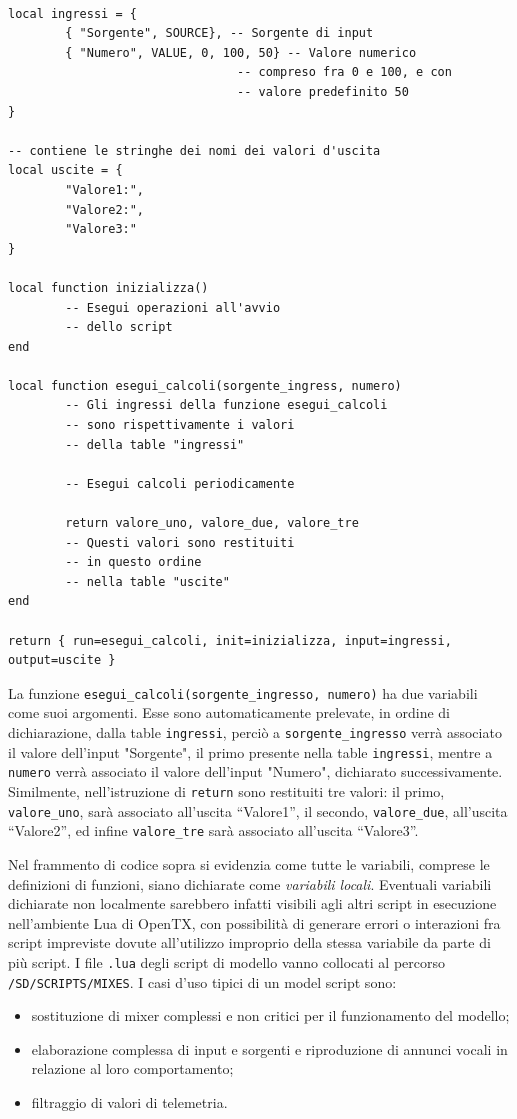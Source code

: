 \documentclass[a4paper, 12pt]{report}
\begin{document}
\begin{lstlisting}

local ingressi = {
        { "Sorgente", SOURCE}, -- Sorgente di input
        { "Numero", VALUE, 0, 100, 50} -- Valore numerico
                                -- compreso fra 0 e 100, e con 
                                -- valore predefinito 50
}

-- contiene le stringhe dei nomi dei valori d'uscita
local uscite = { 
        "Valore1:",
        "Valore2:",
        "Valore3:"
}

local function inizializza()
        -- Esegui operazioni all'avvio
        -- dello script
end

local function esegui_calcoli(sorgente_ingress, numero)
        -- Gli ingressi della funzione esegui_calcoli
        -- sono rispettivamente i valori 
        -- della table "ingressi"

        -- Esegui calcoli periodicamente
        
        return valore_uno, valore_due, valore_tre
        -- Questi valori sono restituiti
        -- in questo ordine
        -- nella table "uscite"
end

return { run=esegui_calcoli, init=inizializza, input=ingressi, output=uscite }

\end{lstlisting}

La funzione \texttt{esegui\_calcoli(sorgente\_ingresso, numero)} ha due variabili come suoi argomenti. Esse sono automaticamente prelevate, in ordine di dichiarazione, dalla table \texttt{ingressi}, perciò a \texttt{sorgente\_ingresso} verrà associato il valore dell'input "Sorgente", il primo presente nella table \texttt{ingressi}, mentre a \texttt{numero} verrà associato il valore dell'input "Numero", dichiarato successivamente. Similmente, nell'istruzione di \texttt{return} sono restituiti tre valori: il primo, \texttt{valore\_uno}, sarà associato all'uscita ``Valore1'', il secondo, \texttt{valore\_due}, all'uscita ``Valore2'', ed infine \texttt{valore\_tre} sarà associato all'uscita ``Valore3''.

Nel frammento di codice sopra si evidenzia come tutte le variabili, comprese le definizioni di funzioni, siano dichiarate come \emph{variabili locali}. Eventuali variabili dichiarate non localmente sarebbero infatti visibili agli altri script in esecuzione nell'ambiente Lua di OpenTX, con possibilità di generare errori o interazioni fra script impreviste dovute all'utilizzo improprio della stessa variabile da parte di più script. I file \texttt{.lua} degli script di modello vanno collocati al percorso \texttt{/SD/SCRIPTS/MIXES}.
I casi d'uso tipici di un model script sono:
\begin{itemize}
        \item sostituzione di mixer complessi e non critici per il funzionamento del modello;
        \item elaborazione complessa di input e sorgenti e riproduzione di annunci vocali in relazione al loro comportamento;
        \item filtraggio di valori di telemetria.
\end{itemize}
\end{document}
